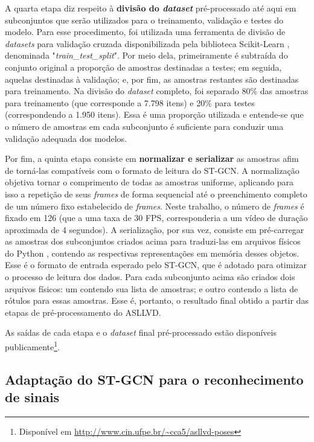 A quarta etapa diz respeito à \textbf{divisão do \textit{dataset}} pré-processado até aqui em subconjuntos que serão utilizados para o treinamento, validação e testes do modelo. Para esse procedimento, foi utilizada uma ferramenta de divisão de \textit{datasets} para validação cruzada disponibilizada pela biblioteca Scikit-Learn \cite{scikit-learn}, denominada "\textit{train\_test\_split}". Por meio dela, primeiramente é subtraída do conjunto original a proporção de amostras destinadas a testes; em seguida, aquelas destinadas à validação; e, por fim, as amostras restantes são destinadas para treinamento. Na divisão do \textit{dataset} completo, foi separado 80\% das amostras para treinamento (que corresponde a 7.798 itens) e 20\% para testes (correspondendo a 1.950 itens). Essa é uma proporção utilizada e entende-se que o número de amostras em cada subconjunto é suficiente para conduzir uma validação adequada dos modelos.

Por fim, a quinta etapa consiste em \textbf{normalizar e serializar} as amostras afim de torná-las compatíveis com o formato de leitura do ST-GCN. A normalização objetiva tornar o comprimento de todas as amostras uniforme, aplicando para isso a repetição de seus \textit{frames} de forma sequencial até o preenchimento completo de um número fixo estabelecido de \textit{frames}. Neste trabalho, o número de \textit{frames} é fixado em 126 (que a uma taxa de 30 FPS, corresponderia a um vídeo de duração aproximada de 4 segundos). A serialização, por sua vez, consiste em pré-carregar as amostras dos subconjuntos criados acima para traduzi-las em arquivos físicos do Python \cite{python}, contendo as respectivas representações em memória desses objetos. Esse é o formato de entrada esperado pelo ST-GCN, que é adotado para otimizar o processo de leitura dos dados. Para cada subconjunto acima são criados dois arquivos físicos: um contendo sua lista de amostras; e outro contendo a lista de rótulos para essas amostras. Esse é, portanto, o resultado final obtido a partir das etapas de pré-processamento do ASLLVD.

As saídas de cada etapa e o \textit{dataset} final pré-processado estão disponíveis publicamente\footnote{
    Disponível em \url{http://www.cin.ufpe.br/~cca5/asllvd-poses}
}.


\subsection{Adaptação do ST-GCN para o reconhecimento de sinais} %

